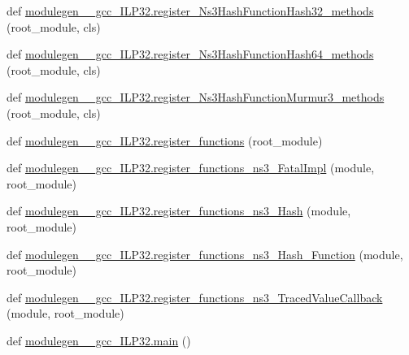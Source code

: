 \begin{DoxyCompactItemize}
\item 
def \hyperlink{namespacemodulegen____gcc__ILP32_afac315fff05eebcf56ca0655484fb790}{modulegen\+\_\+\+\_\+gcc\+\_\+\+I\+L\+P32.\+register\+\_\+\+Ns3\+Hash\+Function\+Hash32\+\_\+methods} (root\+\_\+module, cls)
\item 
def \hyperlink{namespacemodulegen____gcc__ILP32_a5bb0479ce8e16c48c18c0b8db959d57b}{modulegen\+\_\+\+\_\+gcc\+\_\+\+I\+L\+P32.\+register\+\_\+\+Ns3\+Hash\+Function\+Hash64\+\_\+methods} (root\+\_\+module, cls)
\item 
def \hyperlink{namespacemodulegen____gcc__ILP32_aac40fb7a316e95e431da9cf4c6a3e3a0}{modulegen\+\_\+\+\_\+gcc\+\_\+\+I\+L\+P32.\+register\+\_\+\+Ns3\+Hash\+Function\+Murmur3\+\_\+methods} (root\+\_\+module, cls)
\item 
def \hyperlink{namespacemodulegen____gcc__ILP32_a78223e19764a9a9c4a101c5cff0fe501}{modulegen\+\_\+\+\_\+gcc\+\_\+\+I\+L\+P32.\+register\+\_\+functions} (root\+\_\+module)
\item 
def \hyperlink{namespacemodulegen____gcc__ILP32_afe103c28425c708bef38a8cb16badb60}{modulegen\+\_\+\+\_\+gcc\+\_\+\+I\+L\+P32.\+register\+\_\+functions\+\_\+ns3\+\_\+\+Fatal\+Impl} (module, root\+\_\+module)
\item 
def \hyperlink{namespacemodulegen____gcc__ILP32_a15bbba0d88ee02afb1f5d32d8a94ea14}{modulegen\+\_\+\+\_\+gcc\+\_\+\+I\+L\+P32.\+register\+\_\+functions\+\_\+ns3\+\_\+\+Hash} (module, root\+\_\+module)
\item 
def \hyperlink{namespacemodulegen____gcc__ILP32_a0f9329a49ae57d68c45aee88be7a193f}{modulegen\+\_\+\+\_\+gcc\+\_\+\+I\+L\+P32.\+register\+\_\+functions\+\_\+ns3\+\_\+\+Hash\+\_\+\+Function} (module, root\+\_\+module)
\item 
def \hyperlink{namespacemodulegen____gcc__ILP32_af7ef11aed69cbf420d75dc2f54dcef3d}{modulegen\+\_\+\+\_\+gcc\+\_\+\+I\+L\+P32.\+register\+\_\+functions\+\_\+ns3\+\_\+\+Traced\+Value\+Callback} (module, root\+\_\+module)
\item 
def \hyperlink{namespacemodulegen____gcc__ILP32_aadf64690f6ba129a8d42469ea6da5a2d}{modulegen\+\_\+\+\_\+gcc\+\_\+\+I\+L\+P32.\+main} ()
\end{DoxyCompactItemize}
